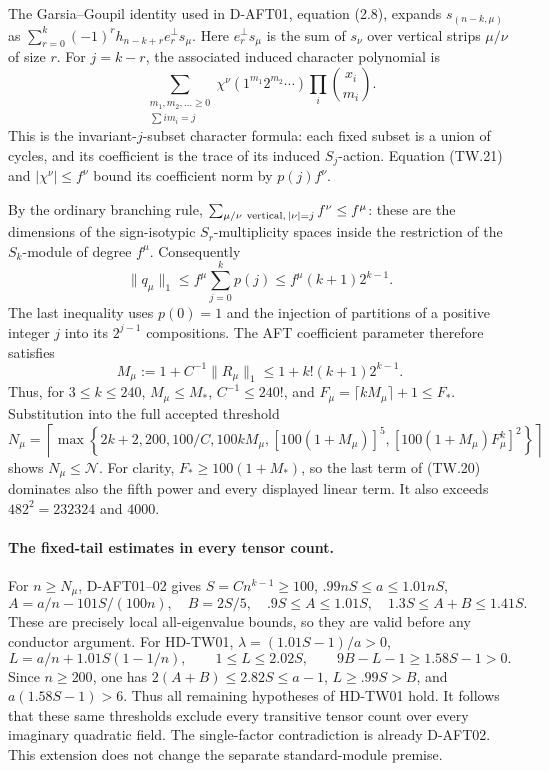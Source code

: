 The Garsia--Goupil identity used in D-AFT01, equation (2.8),\cite{HD:GarsiaGoupil2009} expands
\(s_{(n-k,\mu)}\) as
\(\sum_{r=0}^k(-1)^r h_{n-k+r}e_r^\perp s_\mu\).
Here \(e_r^\perp s_\mu\) is the sum of \(s_\nu\) over vertical strips
\(\mu/\nu\) of size \(r\).
For \(j=k-r\), the associated induced character polynomial is
\[
 \sum_{\substack{m_1,m_2,\ldots\ge0\\ \sum i m_i=j}}
  \chi^\nu(1^{m_1}2^{m_2}\cdots)
  \prod_i\binom{x_i}{m_i}.
 \tag{TW.22}
\]
This is the invariant-\(j\)-subset character formula: each fixed subset
is a union of cycles, and its coefficient is the trace of its induced
\(S_j\)-action.  Equation (TW.21) and
\(|\chi^\nu|\le f^\nu\) bound its coefficient norm by \(p(j)f^\nu\).

By the ordinary branching rule,
\(\sum_{\mu/\nu\ {\rm vertical},\,|\nu|=j}f^\nu\le f^\mu\):
these are the dimensions of the sign-isotypic \(S_r\)-multiplicity spaces
inside the restriction of the \(S_k\)-module of degree \(f^\mu\).
Consequently
\[
 \|q_\mu\|_1
 \le f^\mu\sum_{j=0}^kp(j)
 \le f^\mu(k+1)2^{k-1}.
 \tag{TW.23}
\]
The last inequality uses \(p(0)=1\) and the injection of partitions of a
positive integer \(j\) into its \(2^{j-1}\) compositions.
The AFT coefficient parameter therefore satisfies
\[
 M_\mu:=1+C^{-1}\|R_\mu\|_1
 \le 1+k!(k+1)2^{k-1}.
 \tag{TW.24}
\]
Thus, for \(3\le k\le240\),
\(M_\mu\le M_*\), \(C^{-1}\le240!\), and
\(F_\mu=\lceil kM_\mu\rceil+1\le F_*\).
Substitution into the full accepted threshold
\[
 N_\mu=\left\lceil\max\left\{
 2k+2,200,100/C,100kM_\mu,
 [100(1+M_\mu)]^5,
 [100(1+M_\mu)F_\mu^k]^2
 \right\}\right\rceil
 \tag{TW.25}
\]
shows \(N_\mu\le\mathcal N\).
For clarity, \(F_*\ge100(1+M_*)\), so the last term of (TW.20) dominates
also the fifth power and every displayed linear term.  It also exceeds
\(482^2=232324\) and \(4000\).

\paragraph{The fixed-tail estimates in every tensor count.}
For \(n\ge N_\mu\), D-AFT01--02 gives
\(S=Cn^{k-1}\ge100\),
\(.99nS\le a\le1.01nS\),
\[
 A=a/n-101S/(100n),\quad B=2S/5,\quad
 .9S\le A\le1.01S,\quad1.3S\le A+B\le1.41S.
 \tag{TW.26}
\]
These are precisely local all-eigenvalue bounds, so they are valid before
any conductor argument.
For HD-TW01,
\(\lambda=(1.01S-1)/a>0\),
\[
 L=a/n+1.01S(1-1/n),\qquad
 1\le L\le2.02S,\qquad
 9B-L-1\ge1.58S-1>0.
 \tag{TW.27}
\]
Since \(n\ge200\), one has
\(2(A+B)\le2.82S\le a-1\),
\(L\ge .99S>B\), and \(a(1.58S-1)>6\).
Thus all remaining hypotheses of HD-TW01 hold.
It follows that these same thresholds exclude every transitive tensor
count over every imaginary quadratic field.
The single-factor contradiction is already D-AFT02.
This extension does not change the separate standard-module premise.

